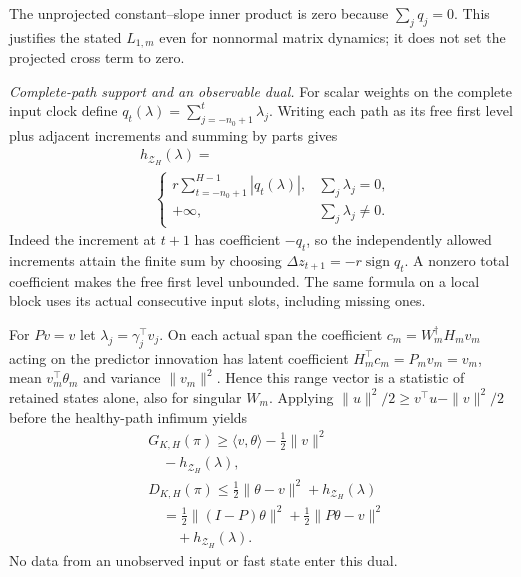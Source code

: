 \documentclass[journal]{IEEEtran}
\begin{document}
The unprojected constant--slope inner product is zero because
$\sum_jq_j=0$. This justifies the stated $L_{1,m}$ even for nonnormal
matrix dynamics; it does not set the projected cross term to zero.

\par\smallskip\noindent\textit{Complete-path support and an observable dual.}\enspace 
For scalar weights on the complete input clock define
$q_t(\lambda)=\sum_{j=-n_0+1}^t\lambda_j$.
Writing each path as its free first level plus adjacent increments and
summing by parts gives
\begin{equation}\label{sf:support}
\begin{aligned}
&h_{\mathcal Z_H}(\lambda)=\\
&\quad\begin{cases}r\displaystyle\sum_{t=-n_0+1}^{H-1}|q_t(\lambda)|,&\displaystyle\sum_j\lambda_j=0,\\+\infty,&\displaystyle\sum_j\lambda_j\ne0.\end{cases}
\end{aligned}
\end{equation}
Indeed the increment at $t+1$ has coefficient $-q_t$, so the independently
allowed increments attain the finite sum by choosing
$\Delta z_{t+1}=-r\operatorname{sign}q_t$. A nonzero total coefficient makes
the free first level unbounded. The same formula on a local block uses
its actual consecutive input slots, including missing ones.

For $Pv=v$ let $\lambda_j=\gamma_j^\top v_j$. On each actual span the
coefficient $c_m=W_m^\dagger H_mv_m$ acting on the predictor innovation has
latent coefficient $H_m^\top c_m=P_mv_m=v_m$, mean $v_m^\top\theta_m$
and variance $\|v_m\|^2$. Hence this range vector is a statistic of retained
states alone, also for singular $W_m$. Applying
$\|u\|^2/2\ge v^\top u-\|v\|^2/2$ before the healthy-path infimum yields
\begin{equation}\label{sf:dual}
\begin{aligned}
&G_{K,H}(\pi)\ge\langle v,\theta\rangle-\tfrac12\|v\|^2\\
&\quad-h_{\mathcal Z_H}(\lambda),\\
&D_{K,H}(\pi)\le\tfrac12\|\theta-v\|^2+h_{\mathcal Z_H}(\lambda)\\
&\quad=\tfrac12\|(I-P)\theta\|^2+\tfrac12\|P\theta-v\|^2\\
&\qquad+h_{\mathcal Z_H}(\lambda).
\end{aligned}
\end{equation}
No data from an unobserved input or fast state enter this dual.
\end{document}
